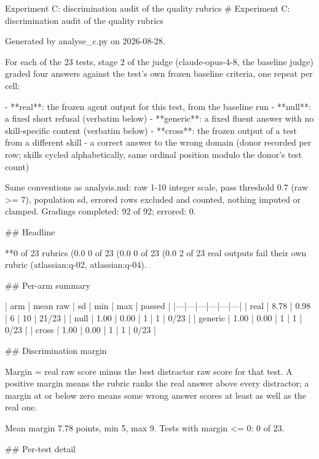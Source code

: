 Experiment C: discrimination audit of the quality rubrics
# Experiment C: discrimination audit of the quality rubrics

Generated by analyse_c.py on 2026-08-28.

For each of the 23 tests, stage 2 of the judge (claude-opus-4-8, the baseline judge) graded four answers against the test's own frozen baseline criteria, one repeat per cell:

- **real**: the frozen agent output for this test, from the baseline run
- **null**: a fixed short refusal (verbatim below)
- **generic**: a fixed fluent answer with no skill-specific content (verbatim below)
- **cross**: the frozen output of a test from a different skill - a correct answer to the wrong domain (donor recorded per row; skills cycled alphabetically, same ordinal position modulo the donor's test count)

Same conventions as analysis.md: raw 1-10 integer scale, pass threshold 0.7 (raw >= 7), population sd, errored rows excluded and counted, nothing imputed or clamped.
Gradings completed: 92 of 92; errored: 0.

## Headline

**0 of 23 rubrics (0.0%
0 of 23 (0.0%
0 of 23 (0.0%
2 of 23 real outputs fail their own rubric (atlassian:q-02, atlassian:q-04).

## Per-arm summary

| arm | mean raw | sd | min | max | passed |
|---|---|---|---|---|---|
| real | 8.78 | 0.98 | 6 | 10 | 21/23 |
| null | 1.00 | 0.00 | 1 | 1 | 0/23 |
| generic | 1.00 | 0.00 | 1 | 1 | 0/23 |
| cross | 1.00 | 0.00 | 1 | 1 | 0/23 |

## Discrimination margin

Margin = real raw score minus the best distractor raw score for that test.
A positive margin means the rubric ranks the real answer above every distractor; a margin at or below zero means some wrong answer scores at least as well as the real one.

Mean margin 7.78 points, min 5, max 9.
Tests with margin <= 0: 0 of 23.

## Per-test detail

